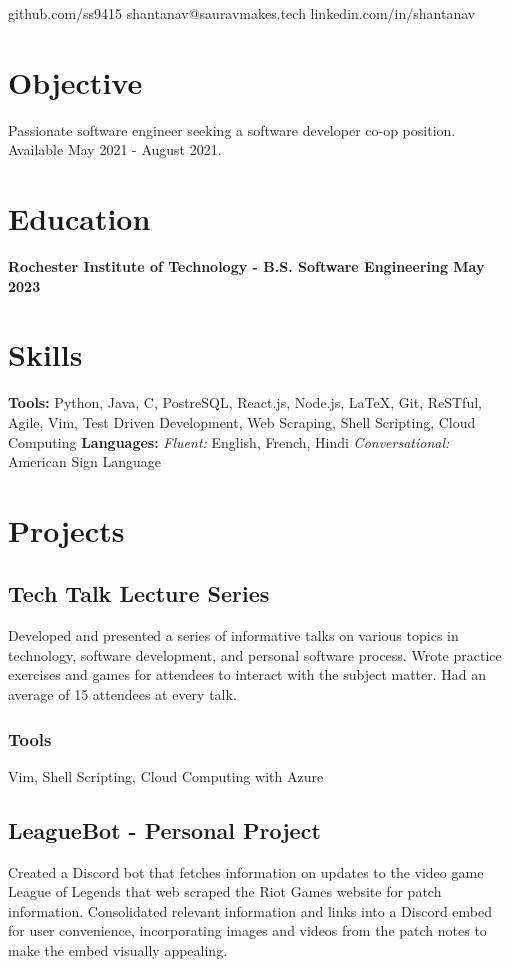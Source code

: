 \documentclass[11pt, letterpaper]{article}
\makeatletter
\renewcommand{\maketitle} {
    \thispagestyle{empty}
    \begin{center}    
        {\huge\bfseries \theauthor}

        \vspace{.5em}

        \quad \quad \quad \quad
        \faGithub \quad github.com/ss9415 \quad 
        \Letter \quad  shantanav@sauravmakes.tech \quad
        \faLinkedin \quad linkedin.com/in/shantanav \quad  

    \end{center}
}
\makeatother
\begin{document}
    \author{Shantanav Saurav}
    \maketitle

    \section{Objective}
        Passionate software engineer seeking a software developer co-op position. 
        Available May 2021 - August 2021.
    \section{Education}
        \textbf{Rochester Institute of Technology - B.S. Software Engineering \hfill May 2023}

    \section{Skills}
        \textbf{Tools:}
            Python, Java, C, PostreSQL, React.js, Node.js, LaTeX, Git, ReSTful, Agile, Vim,
            Test Driven Development, Web Scraping, Shell Scripting, Cloud Computing \newline
        \textbf{Languages:}
            \emph{Fluent:} English, French, Hindi 
            \emph{Conversational:} American Sign Language

    \section{Projects}
        \subsection{Tech Talk Lecture Series}
            Developed and presented a series of informative talks on various topics in technology, software 
            development, and personal software process. Wrote practice exercises and games for attendees to 
            interact with the subject matter. Had an average of 15 attendees at every talk.
            \subsubsection{Tools}
                Vim, Shell Scripting, Cloud Computing with Azure

        \subsection{LeagueBot - Personal Project}
            Created a Discord bot that fetches information on updates to the video game League of Legends 
            that web scraped the Riot Games website for patch information. Consolidated relevant information 
            and links into a Discord embed for user convenience, incorporating images and videos from the 
            patch notes to make the embed visually appealing.
\end{document}
